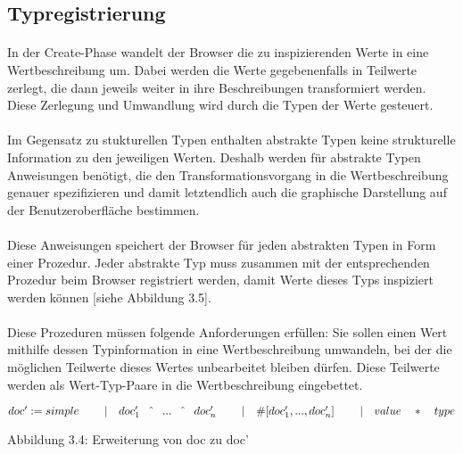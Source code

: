 \documentclass[12pt,a4paper]{article}
\begin{document}
\subsection{Typregistrierung}

\paragraph{}

In der Create-Phase wandelt der Browser die zu inspizierenden 
Werte in eine Wertbeschreibung um. Dabei werden die Werte 
gegebenenfalls in Teilwerte zerlegt, die dann jeweils 
weiter in ihre Beschreibungen transformiert werden. 
Diese Zerlegung und Umwandlung wird durch die Typen der 
Werte gesteuert.

\paragraph{}

Im Gegensatz zu stukturellen Typen enthalten abstrakte Typen 
keine strukturelle Information zu den jeweiligen Werten.
Deshalb werden f\"ur abstrakte Typen Anweisungen 
ben\"otigt, die den Transformationsvorgang in die 
Wertbeschreibung genauer spezifizieren und damit letztendlich 
auch die graphische Darstellung auf der Benutzeroberfl\"ache 
bestimmen. 

\paragraph{}

Diese Anweisungen speichert der Browser f\"ur 
jeden abstrakten Typen in Form einer Prozedur. 
Jeder abstrakte Typ muss zusammen mit der entsprechenden
Prozedur beim Browser registriert werden, damit Werte 
dieses Typs inspiziert werden k\"onnen [siehe Abbildung 3.5]. 

\paragraph{}

Diese Prozeduren m\"ussen folgende Anforderungen 
erf\"ullen: Sie sollen einen Wert mithilfe dessen 
Typinformation in eine Wertbeschreibung umwandeln, 
bei der die m\"oglichen Teilwerte dieses 
Wertes unbearbeitet bleiben d\"urfen. Diese 
Teilwerte werden als Wert-Typ-Paare in 
die Wertbeschreibung eingebettet.\\[1mm]

\begin{minipage}{15cm}
\begin{math}
  doc' :=  simple\newline
  \hspace{8mm} | \quad doc'_{1} \quad \hat{} \quad ... \quad \hat{} 
                 \quad doc'_{n}\newline
  \hspace{8mm} | \quad \# \lbrack doc'_{1}, ... , doc'_{n}\rbrack\newline
  \hspace{8mm} | \quad value \quad * \quad type 
\end{math} \newline
\end{minipage}
 Abbildung 3.4: Erweiterung von doc zu doc' 
\end{document}
